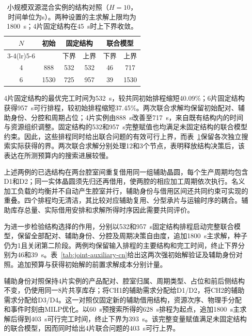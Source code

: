 \documentclass[final,5p,times,twocolumn]{elsarticle}
\begin{document}
\begin{table}[!t]
\centering\scriptsize\setlength{\tabcolsep}{3pt}
\caption{小规模双源混合实例的结构对照（$H=10$，时间单位为s）。两种设置的主求解上限均为1800~s；4片固定结构在45~s时上下界收敛。}
\label{tab:joint-small-cn}
\begin{tabular}{cccccc}\toprule
\multirow{2}{*}{$N$} & \multirow{2}{*}{初始} & \multicolumn{2}{c}{固定结构} & \multicolumn{2}{c}{联合模型}\\
\cmidrule(lr){3-4}\cmidrule(lr){5-6}
 & & 下界 & 上界 & 下界 & 上界\\\midrule
4 & 888 & 532 & 532 & 46 & 717\\
6 & 1530 & 725 & 957 & 39 & 1530\\
\bottomrule\end{tabular}\end{table}

4片固定结构的最优完工时间为532~s，较共同初始排程缩短40.09\%；6片固定结构获得957~s可行排程，较初始排程缩短37.45\%。两次联合求解均保留初始配对、辅助身份、分腔和周期占位；4片实例由888~s改善至717~s，来自既有结构内的时间与资源组织调整。固定结构的532和957~s完整赋值也均满足未固定结构的联合模型约束。因此，这些排程同时给出联合问题的有效可行上界，而表~\ref{tab:joint-small-cn}保留各次独立搜索实际获得的界。两次联合求解分别处理12和3个节点，表明释放结构决策后，该表达在所测预算内的搜索进展较慢。

上述两例的已选结构在两台腔室间重复借用同一组辅助晶圆，每个生产周期均包含D1和D2；同一实体晶圆须先归还再借用，使两腔的相应加工周期依次执行。名义加工负载的均衡并不自动产生腔室并行，辅助身份与借用区间还共同约束可实现的重叠。四个排程均无清洁，其比较对应辅助复用、分型承片与运输时序的耦合。辅助库存总量、实际借用安排和求解所得时序因此需要共同评价。

为进一步检验结构选择的作用，分别以532和957~s固定结构排程启动完整联合模型，保留全部配对、辅助身份、分腔及周期决策自由度，追加1800~s主求解，种子仍为1且关闭第二阶段。两例均保留输入排程的主要结构和完工时间，终止下界分别为46和39~s。表~\ref{tab:joint-auxiliary-cn}给出这两次强初始解验证及辅助身份对照。追加预算与获得初始解的前置求解成本分别计量。

辅助身份对照保持4片实例的产品配对、腔室归属、周期类型、占位和前后侧结构不变，仍使用同一8片共享库存；将CH1的辅助需求分配给D1/D2，将CH2的辅助需求分配给D3/D4。这一对照仅固定新的辅助借用结构，资源次序、物理手分配和事件时刻由MILP优化。以60~s预搜索所得的628~s排程为起点，追加1800~s主求解后得到403~s可行完工时间，终止下界为393~s。该完整变量赋值满足未固定结构的联合模型，因而同时给出4片联合问题的403~s可行上界。
\end{document}
